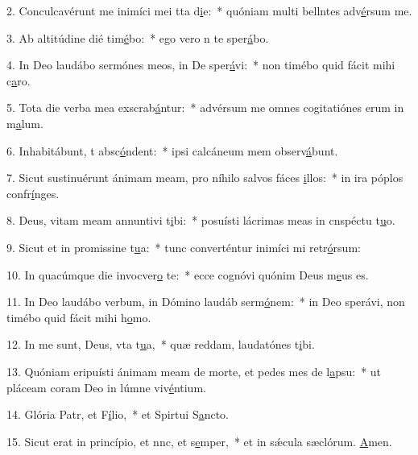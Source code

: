 2. Conculcavérunt me inimíci mei tta d\uline{i}e:~* quóniam multi bellntes adv\uline{é}rsum me.\par 
3. Ab altitúdine dié tim\uline{é}bo:~* ego vero n te sper\uline{á}bo.\par 
4. In Deo laudábo sermónes meos, in De sper\uline{á}vi:~* non timébo quid fácit mihi c\uline{a}ro.\par 
5. Tota die verba mea exscrab\uline{á}ntur:~* advérsum me omnes cogitatiónes erum in m\uline{a}lum.\par 
6. Inhabitábunt, t absc\uline{ó}ndent:~* ipsi calcáneum mem observ\uline{á}bunt.\par 
7. Sicut sustinuérunt ánimam meam, pro níhilo salvos fáces \uline{i}llos:~* in ira póplos confr\uline{í}nges.\par 
8. Deus, vitam meam annuntivi t\uline{i}bi:~* posuísti lácrimas meas in cnspéctu t\uline{u}o.\par 
9. Sicut et in promissine t\uline{u}a:~* tunc converténtur inimíci mi retr\uline{ó}rsum:\par 
10. In quacúmque die invocver\uline{o} te:~* ecce cognóvi quónim Deus m\uline{e}us es.\par 
11. In Deo laudábo verbum, in Dómino laudáb serm\uline{ó}nem:~* in Deo sperávi, non timébo quid fácit mihi h\uline{o}mo.\par 
12. In me sunt, Deus, vta t\uline{u}a,~* quæ reddam, laudatónes t\uline{i}bi.\par 
13. Quóniam eripuísti ánimam meam de morte, et pedes mes de l\uline{a}psu:~* ut pláceam coram Deo in lúmne viv\uline{é}ntium.\par 
14. Glória Patr, et F\uline{í}lio,~* et Spirtui S\uline{a}ncto.\par 
15. Sicut erat in princípio, et nnc, et s\uline{e}mper,~* et in sǽcula sæclórum. \uline{A}men.\par 
